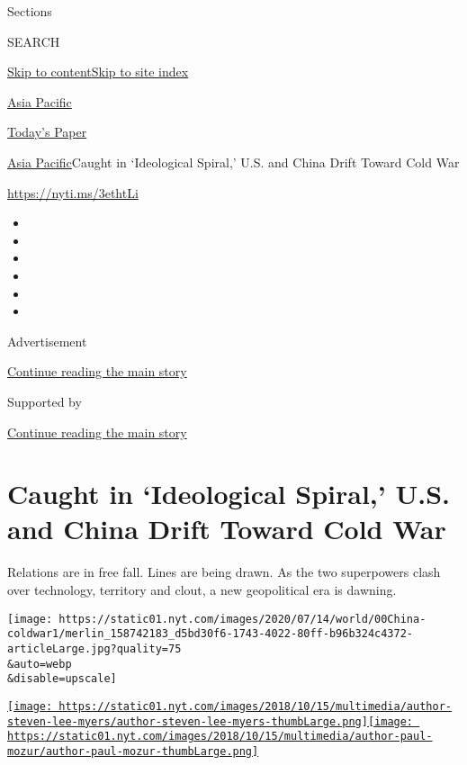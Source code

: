 Sections

SEARCH

\protect\hyperlink{site-content}{Skip to
content}\protect\hyperlink{site-index}{Skip to site index}

\href{https://www.nytimes.com/section/world/asia}{Asia Pacific}

\href{https://myaccount.nytimes.com/auth/login?response_type=cookie\&client_id=vi}{}

\href{https://www.nytimes.com/section/todayspaper}{Today's Paper}

\href{/section/world/asia}{Asia Pacific}\textbar{}Caught in `Ideological
Spiral,' U.S. and China Drift Toward Cold War

\url{https://nyti.ms/3ethtLi}

\begin{itemize}
\item
\item
\item
\item
\item
\item
\end{itemize}

Advertisement

\protect\hyperlink{after-top}{Continue reading the main story}

Supported by

\protect\hyperlink{after-sponsor}{Continue reading the main story}

\hypertarget{caught-in-ideological-spiral-us-and-china-drift-toward-cold-war}{%
\section{Caught in `Ideological Spiral,' U.S. and China Drift Toward
Cold
War}\label{caught-in-ideological-spiral-us-and-china-drift-toward-cold-war}}

Relations are in free fall. Lines are being drawn. As the two
superpowers clash over technology, territory and clout, a new
geopolitical era is dawning.

\texttt{[image: https://static01.nyt.com/images/2020/07/14/world/00China-coldwar1/merlin\_158742183\_d5bd30f6-1743-4022-80ff-b96b324c4372-articleLarge.jpg?quality=75\\\&auto=webp\\\&disable=upscale]}

\href{https://www.nytimes.com/by/steven-lee-myers}{\texttt{[image: https://static01.nyt.com/images/2018/10/15/multimedia/author-steven-lee-myers/author-steven-lee-myers-thumbLarge.png]}}\href{https://www.nytimes.com/by/paul-mozur}{\texttt{[image: https://static01.nyt.com/images/2018/10/15/multimedia/author-paul-mozur/author-paul-mozur-thumbLarge.png]}}

